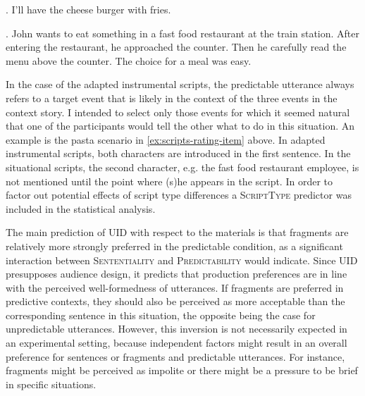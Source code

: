\ex. I'll have the cheese burger with fries.
      
\ex. John wants to eat something in a fast food restaurant at the train station. After entering the restaurant, he approached the counter. Then he carefully read the menu above the counter. The choice for a meal was easy.

In the case of the adapted instrumental scripts, the predictable utterance always refers to a target event that is likely in the context of the three events in the context story. I intended to select only those events for which it seemed natural that one of the participants would tell the other what to do in this situation. An example is the pasta scenario in \ref{ex:scripts-rating-item} above. In adapted instrumental scripts, both characters are introduced in the first sentence. In the situational scripts, the second character, e.g. the fast food restaurant employee, is not mentioned until the point where (s)he appears in the script. In order to factor out potential effects of script type differences a \textsc{ScriptType} predictor was included in the statistical analysis.

The main prediction of UID with respect to the materials is that fragments are relatively more strongly preferred in the predictable condition, as a significant interaction between \textsc{Sententiality} and \textsc{Predictability} would indicate. Since UID presupposes audience design, it predicts that production preferences are in line with the perceived well-formedness of utterances. If fragments are preferred in predictive contexts, they should also be perceived as more acceptable than the corresponding sentence in this situation, the opposite being the case for unpredictable utterances. However, this inversion is not necessarily expected in an experimental setting, because independent factors might result in an overall preference for sentences or fragments and predictable utterances. For instance, fragments might be perceived as impolite or there might be a pressure to be brief in specific situations.

